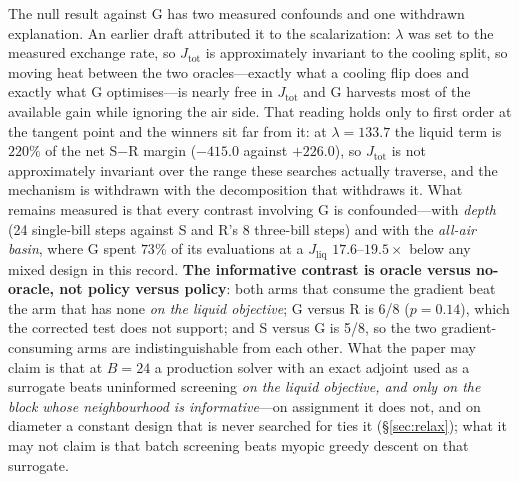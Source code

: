 \documentclass{article}
\newcommand{\Jliq}{J_{\mathrm{liq}}}
\newcommand{\Jtot}{J_{\mathrm{tot}}}
\begin{document}
The null result against G has two measured confounds and one withdrawn
explanation.  An earlier draft attributed it to the scalarization: $\lambda$ was
set to the measured exchange rate, so $\Jtot$ is approximately invariant to the
cooling split, so moving heat between the two oracles---exactly what a cooling
flip does and exactly what G optimises---is nearly free in $\Jtot$ and G harvests
most of the available gain while ignoring the air side.  That reading holds only
to first order at the tangent point and the winners sit far from it: at
$\lambda = 133.7$ the liquid term is $220\%$ of the net S$-$R margin
($-415.0$ against $+226.0$), so $\Jtot$ is not approximately invariant over the
range these searches actually traverse, and the mechanism is withdrawn with the
decomposition that withdraws it.  What remains measured is that every contrast
involving G is confounded---with \emph{depth} (24 single-bill steps against S
and R's 8 three-bill steps) and with the \emph{all-air basin}, where G spent
$73\%$ of its evaluations at a $\Jliq$ $17.6$--$19.5\times$ below any mixed design
in this record.
\textbf{The informative contrast is
oracle versus no-oracle, not policy versus policy}: both arms that consume the
gradient beat the arm that has none \emph{on the liquid objective}; G versus R is
6/8 ($p = 0.14$), which the corrected test does not support; and S versus G is 5/8,
so the two gradient-consuming arms are indistinguishable from each
other.  What the paper may claim is that at $B = 24$ a production solver with an
exact adjoint used as a surrogate beats uninformed screening \emph{on the liquid
objective, and only on the block whose neighbourhood is informative}---on assignment it
does not, and on diameter a constant design that is never searched for ties it
(\S\ref{sec:relax}); what it may not
claim is that batch screening beats myopic greedy descent on that surrogate.
\end{document}
